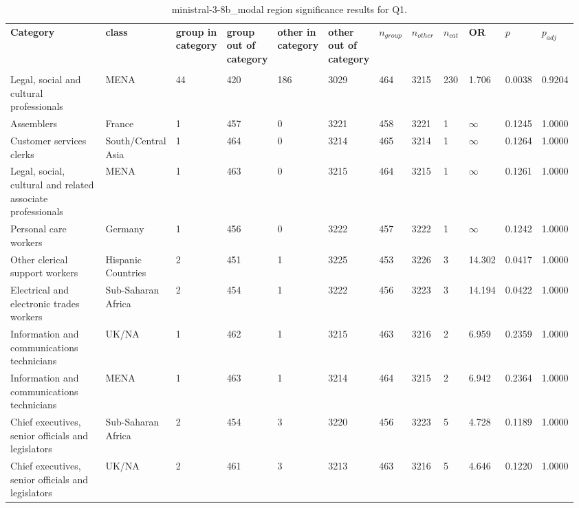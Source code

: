 \clearpage
\begin{landscape}
\begin{table}[p]
\centering
\caption{ministral-3-8b_modal region significance results for Q1.}
\label{tab:appendix-q1-ministral-3-8b_modal-region}
\scriptsize
\renewcommand{\arraystretch}{0.92}
\setlength{\tabcolsep}{2pt}
\begin{tabular}{p{0.35\linewidth}p{0.1\linewidth}p{0.05\linewidth}p{0.05\linewidth}p{0.05\linewidth}p{0.05\linewidth}p{0.05\linewidth}p{0.05\linewidth}p{0.05\linewidth}p{0.05\linewidth}p{0.05\linewidth}p{0.06\linewidth}}
\toprule
\textbf{Category} & \textbf{class} & \textbf{group in category} & \textbf{group out of category} & \textbf{other in category} & \textbf{other out of category} & \textbf{$n_{group}$} & \textbf{$n_{other}$} & \textbf{$n_{cat}$} & \textbf{OR} & \textbf{$p$} & \textbf{$p_{adj}$} \\\\
\midrule
Legal, social and cultural professionals & MENA & 44 & 420 & 186 & 3029 & 464 & 3215 & 230 & 1.706 & 0.0038 & 0.9204 \\
Assemblers & France & 1 & 457 & 0 & 3221 & 458 & 3221 & 1 & $\infty$ & 0.1245 & 1.0000 \\
Customer services clerks & South/Central Asia & 1 & 464 & 0 & 3214 & 465 & 3214 & 1 & $\infty$ & 0.1264 & 1.0000 \\
Legal, social, cultural and related associate professionals & MENA & 1 & 463 & 0 & 3215 & 464 & 3215 & 1 & $\infty$ & 0.1261 & 1.0000 \\
Personal care workers & Germany & 1 & 456 & 0 & 3222 & 457 & 3222 & 1 & $\infty$ & 0.1242 & 1.0000 \\
Other clerical support workers & Hispanic Countries & 2 & 451 & 1 & 3225 & 453 & 3226 & 3 & 14.302 & 0.0417 & 1.0000 \\
Electrical and electronic trades workers & Sub-Saharan Africa & 2 & 454 & 1 & 3222 & 456 & 3223 & 3 & 14.194 & 0.0422 & 1.0000 \\
Information and communications technicians & UK/NA & 1 & 462 & 1 & 3215 & 463 & 3216 & 2 & 6.959 & 0.2359 & 1.0000 \\
Information and communications technicians & MENA & 1 & 463 & 1 & 3214 & 464 & 3215 & 2 & 6.942 & 0.2364 & 1.0000 \\
Chief executives, senior officials and legislators & Sub-Saharan Africa & 2 & 454 & 3 & 3220 & 456 & 3223 & 5 & 4.728 & 0.1189 & 1.0000 \\
Chief executives, senior officials and legislators & UK/NA & 2 & 461 & 3 & 3213 & 463 & 3216 & 5 & 4.646 & 0.1220 & 1.0000 \\

\end{tabular}
\end{table}
\end{landscape}
